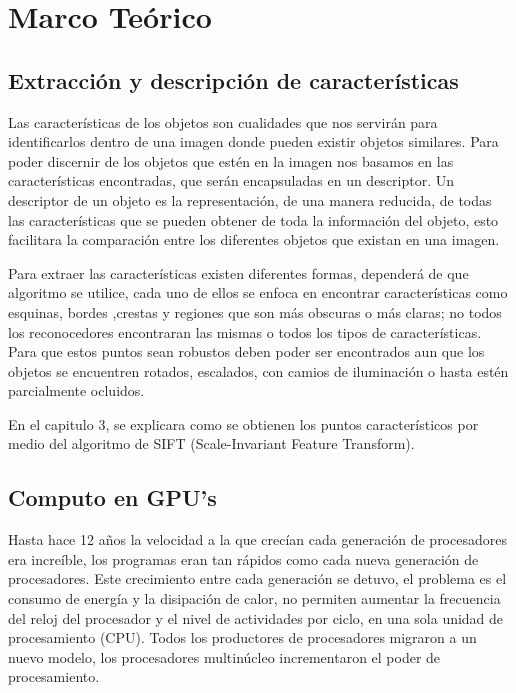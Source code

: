 \chapter {Marco Teórico}

\section {Extracción y descripción de características}

Las características de los objetos son cualidades que nos servirán para identificarlos dentro de una imagen donde pueden existir objetos similares. Para poder discernir de los objetos que estén en la imagen nos basamos en las características encontradas, que serán encapsuladas en un descriptor. Un descriptor de un objeto es la representación, de una manera reducida, de todas las características que se pueden obtener de toda la información del objeto, esto facilitara la comparación entre los diferentes objetos que existan en una imagen.

Para extraer las características existen diferentes formas, dependerá de que algoritmo se utilice, cada uno de ellos se enfoca en encontrar características como esquinas, bordes ,crestas y regiones que son más obscuras o más claras; no todos los reconocedores encontraran las mismas o todos los tipos de características. Para que estos puntos sean robustos deben poder ser encontrados aun que los objetos se encuentren rotados, escalados, con camios de iluminación o hasta estén parcialmente ocluidos.

En el capitulo 3, se explicara como se obtienen los puntos característicos por medio del algoritmo de SIFT (Scale-Invariant Feature Transform).


\pagebreak

\section {Computo en GPU's}

Hasta hace 12 años la velocidad a la que crecían cada generación de procesadores era increíble, los programas eran tan rápidos como cada nueva generación de procesadores. Este crecimiento entre cada generación se detuvo, el problema es el consumo de energía y la disipación de calor, no permiten aumentar la frecuencia del reloj del procesador y el nivel de actividades por ciclo, en una sola unidad de procesamiento (CPU). Todos los productores de procesadores migraron a un nuevo modelo, los procesadores multinúcleo incrementaron el poder de procesamiento.

